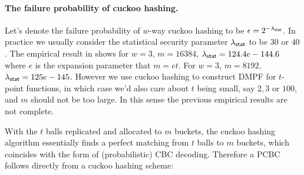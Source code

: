 \paragraph{The failure probability of cuckoo hashing.}Let's denote the failure probability of $w$-way cuckoo hashing to be $\epsilon=2^{-\lambda_{{\sf stat}}}$. In practice we usually consider the statistical security parameter $\lambda_{{\sf stat}}$ to be $30$ or $40$. The empirical result in \cite{chen_fast_2017} shows for $w=3$, $m=16384$, $\lambda_{\sf stat} = 124.4e-144.6$ where $e$ is the expansion parameter that $m=et$. For $w=3$, $m=8192$, $\lambda_{\sf stat}=125e-145$. However we use cuckoo hashing to construct DMPF for $t$-point functions, in which case we'd also care about $t$ being small, say $2,3$ or $100$, and $m$ should not be too large. In this sense the previous empirical results are not complete. 

With the $t$ balls replicated and allocated to $m$ buckets, the cuckoo hashing algorithm essentially finds a perfect matching from $t$ balls to $m$ buckets, which coincides with the form of (probabilistic) CBC decoding. Therefore a PCBC follows directly from a cuckoo hashing scheme: 

